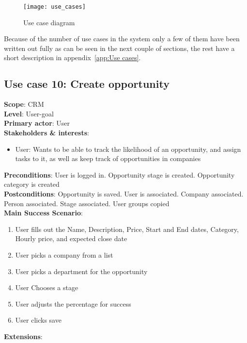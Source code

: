 \begin{figure}[!htb]
  \centering
  \texttt{[image: use\_cases]}
  \caption{Use case diagram}
  \label{fig:usecase_diagram}
\end{figure}

Because of the number of use cases in the system only a few of them have been written out fully as can be seen in the next couple of sections, the rest have a short description in appendix~\ref{app:Use cases}.

\subsection{Use case 10: Create opportunity}
\textbf{Scope}: CRM \\
\textbf{Level}: User-goal \\
\textbf{Primary actor}: User \\
\textbf{Stakeholders \& interests}:
\begin{itemize}
  \item User: Wants to be able to track the likelihood of an opportunity, and
    assign tasks to it, as well as keep track of opportunities in companies 
\end{itemize}
\textbf{Preconditions}: User is logged in. Opportunity stage is created.
Opportunity category is created \\
\textbf{Postconditions}: Opportunity is saved. User is associated. Company
associated. Person associated. Stage associated. User groups copied\\ 
\textbf{Main Success Scenario}:
\begin{enumerate}
  \item User fills out the Name, Description, Price, Start and End dates,
    Category, Hourly price, and expected close date 
  \item User picks a company from a list
  \item User picks a department for the opportunity
  \item User Chooses a stage
  \item User adjusts the percentage for success
  \item User clicks save
\end{enumerate}
\textbf{Extensions}:
